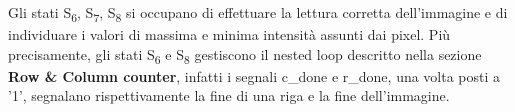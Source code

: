 Gli stati S\textsubscript{6}, S\textsubscript{7}, S\textsubscript{8} si occupano di effettuare la lettura corretta dell'immagine e di individuare i valori di massima e minima intensità assunti dai pixel. Più precisamente, gli stati S\textsubscript{6} e S\textsubscript{8} gestiscono il nested loop descritto nella sezione \textbf{Row \& Column counter}, infatti i segnali c\_done e r\_done, una volta posti a '1', segnalano rispettivamente la fine di una riga e la fine dell'immagine.

